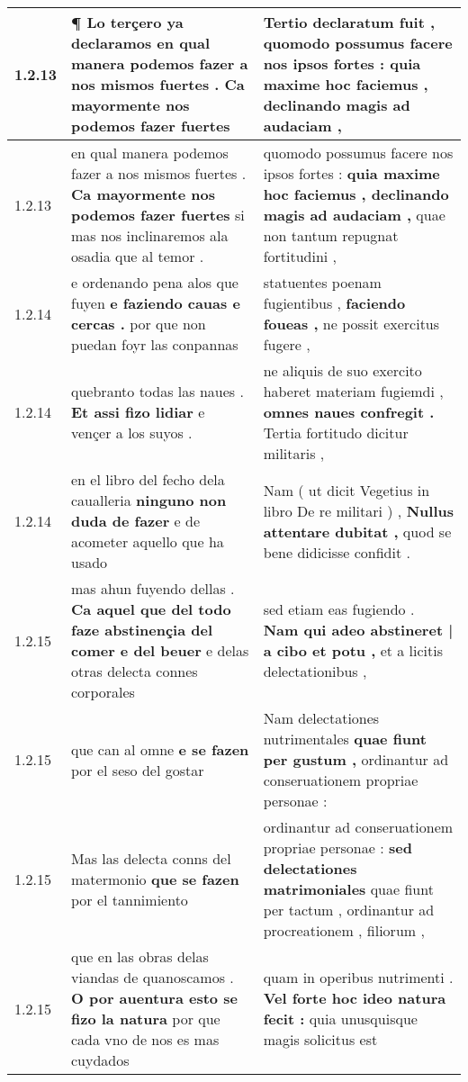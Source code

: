 \begin{tabular}{|p{1cm}|p{6.5cm}|p{6.5cm}|}
1.2.13 & ¶ Lo terçero ya declaramos \textbf{ en qual manera podemos fazer a nos mismos fuertes . } Ca mayormente nos podemos fazer fuertes & Tertio declaratum fuit , \textbf{ quomodo possumus facere nos ipsos fortes : } quia maxime hoc faciemus , declinando magis ad audaciam , \\\hline
1.2.13 & en qual manera podemos fazer a nos mismos fuertes . \textbf{ Ca mayormente nos podemos fazer fuertes } si mas nos inclinaremos ala osadia que al temor . & quomodo possumus facere nos ipsos fortes : \textbf{ quia maxime hoc faciemus , declinando magis ad audaciam , } quae non tantum repugnat fortitudini , \\\hline
1.2.14 & e ordenando pena alos que fuyen \textbf{ e faziendo cauas e cercas . } por que non puedan foyr las conpannas & statuentes poenam fugientibus , \textbf{ faciendo foueas , } ne possit exercitus fugere , \\\hline
1.2.14 & quebranto todas las naues . \textbf{ Et assi fizo lidiar } e vençer a los suyos . & ne aliquis de suo exercito haberet materiam fugiemdi , \textbf{ omnes naues confregit . } Tertia fortitudo dicitur militaris , \\\hline
1.2.14 & en el libro del fecho dela caualleria \textbf{ ninguno non duda de fazer } e de acometer aquello que ha usado & Nam ( ut dicit Vegetius in libro De re militari ) , \textbf{ Nullus attentare dubitat , } quod se bene didicisse confidit . \\\hline
1.2.15 & mas ahun fuyendo dellas . \textbf{ Ca aquel que del todo faze abstinençia del comer e del beuer } e delas otras delecta connes corporales & sed etiam eas fugiendo . \textbf{ Nam qui adeo abstineret | a cibo et potu , } et a licitis delectationibus , \\\hline
1.2.15 & que can al omne \textbf{ e se fazen } por el seso del gostar & Nam delectationes nutrimentales \textbf{ quae fiunt per gustum , } ordinantur ad conseruationem propriae personae : \\\hline
1.2.15 & Mas las delecta conns del matermonio \textbf{ que se fazen } por el tannimiento & ordinantur ad conseruationem propriae personae : \textbf{ sed delectationes matrimoniales } quae fiunt per tactum , ordinantur ad procreationem , filiorum , \\\hline
1.2.15 & que en las obras delas viandas de quanoscamos . \textbf{ O por auentura esto se fizo la natura } por que cada vno de nos es mas cuydados & quam in operibus nutrimenti . \textbf{ Vel forte hoc ideo natura fecit : } quia unusquisque magis solicitus est \\\hline

\end{tabular}
